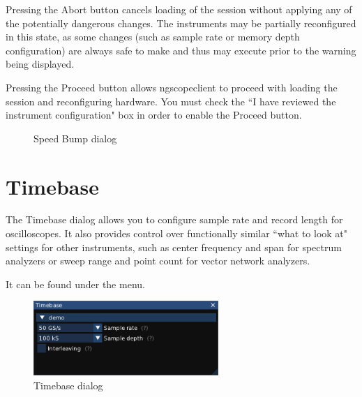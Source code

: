 Pressing the Abort button cancels loading of the session without applying any of the potentially dangerous changes.
The instruments may be partially reconfigured in this state, as some changes (such as sample rate or memory depth
configuration) are always safe to make and thus may execute prior to the warning being displayed.

Pressing the Proceed button allows ngscopeclient to proceed with loading the session and reconfiguring hardware. You
must check the ``I have reviewed the instrument configuration" box in order to enable the Proceed button.

\begin{figure}[H]
\centering
{}
\caption{Speed Bump dialog}
\label{speedbump}
\end{figure}


\section{Timebase}
\label{dlg:timebase}

The Timebase dialog allows you to configure sample rate and record length for oscilloscopes. It also provides control
over functionally similar ``what to look at" settings for other instruments, such as center frequency and span for
spectrum analyzers or sweep range and point count for vector network analyzers.

It can be found under the  menu.

\begin{figure}[H]
\centering
\includegraphics[width=7cm]{ng-images/dialog-timebase.png}
\caption{Timebase dialog}
\label{timebase}
\end{figure}
